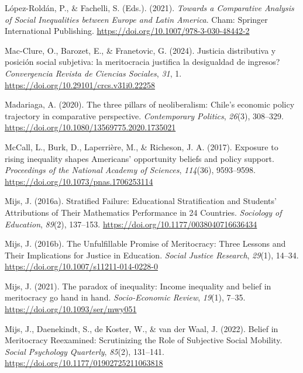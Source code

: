 \documentclass[
  12pt,
]{article}
\newlength{\cslhangindent}
\newenvironment{CSLReferences}[2] %
 {\begin{list}{}{%
  \setlength{\itemindent}{0pt}
  \setlength{\leftmargin}{0pt}
  \setlength{\parsep}{0pt}
  \ifodd #1
   \setlength{\leftmargin}{\cslhangindent}
   \setlength{\itemindent}{-1\cslhangindent}
  \fi
  \setlength{\itemsep}{#2\baselineskip}}}
 {\end{list}}
\begin{document}
\begin{CSLReferences}{1}{0}
López-Roldán, P., \& Fachelli, S. (Eds.). (2021). \emph{Towards a
{Comparative Analysis} of {Social Inequalities} between {Europe} and
{Latin America}}. Cham: Springer International Publishing.
\url{https://doi.org/10.1007/978-3-030-48442-2}

Mac-Clure, O., Barozet, E., \& Franetovic, G. (2024). {Justicia
distributiva y posici{ó}n social subjetiva: {\textquestiondown}la
meritocracia justifica la desigualdad de ingresos?} \emph{Convergencia
Revista de Ciencias Sociales}, \emph{31}, 1.
\url{https://doi.org/10.29101/crcs.v31i0.22258}

Madariaga, A. (2020). The three pillars of neoliberalism: {Chile}'s
economic policy trajectory in comparative perspective.
\emph{Contemporary Politics}, \emph{26}(3), 308--329.
\url{https://doi.org/10.1080/13569775.2020.1735021}

McCall, L., Burk, D., Laperrière, M., \& Richeson, J. A. (2017).
Exposure to rising inequality shapes {Americans}' opportunity beliefs
and policy support. \emph{Proceedings of the National Academy of
Sciences}, \emph{114}(36), 9593--9598.
\url{https://doi.org/10.1073/pnas.1706253114}

Mijs, J. (2016a). Stratified {Failure}: {Educational Stratification} and
{Students}' {Attributions} of {Their Mathematics Performance} in 24
{Countries}. \emph{Sociology of Education}, \emph{89}(2), 137--153.
\url{https://doi.org/10.1177/0038040716636434}

Mijs, J. (2016b). The {Unfulfillable Promise} of {Meritocracy}: {Three
Lessons} and {Their Implications} for {Justice} in {Education}.
\emph{Social Justice Research}, \emph{29}(1), 14--34.
\url{https://doi.org/10.1007/s11211-014-0228-0}

Mijs, J. (2021). The paradox of inequality: Income inequality and belief
in meritocracy go hand in hand. \emph{Socio-Economic Review},
\emph{19}(1), 7--35. \url{https://doi.org/10.1093/ser/mwy051}

Mijs, J., Daenekindt, S., de Koster, W., \& van der Waal, J. (2022).
Belief in {Meritocracy Reexamined}: {Scrutinizing} the {Role} of
{Subjective Social Mobility}. \emph{Social Psychology Quarterly},
\emph{85}(2), 131--141. \url{https://doi.org/10.1177/01902725211063818}


\end{CSLReferences}
\end{document}
